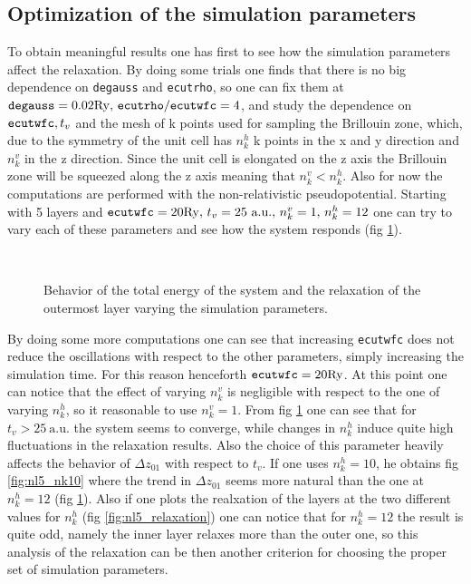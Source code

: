\documentclass[a4paper, 11pt]{article}
\begin{document}
  \subsection{Optimization of the simulation parameters}
    To obtain meaningful results one has first to see how the simulation parameters affect the relaxation. By doing some trials one finds that there is no big dependence on \verb|degauss| and \verb|ecutrho|, so one can fix them at $\verb|degauss| = 0.02 \si{.Ry},\, \verb|ecutrho|/\verb|ecutwfc| = 4$, and study the dependence on $\verb|ecutwfc|, t_v$ and the mesh of k points used for sampling the Brillouin zone, which, due to the symmetry of the unit cell has $n_k^h$ k points in the x and y direction and $n_k^v$ in the z direction. Since the unit cell is elongated on the z axis the Brillouin zone will be squeezed along the z axis meaning that $n_k^v < n_k^h$. Also for now the computations are performed with the non-relativistic pseudopotential.
    Starting with 5 layers and $\verb|ecutwfc| = 20 \si{.Ry},\, t_v = 25\ \text{a.u.},\, n_k^v = 1,\, n_k^h = 12$ one can try to vary each of these parameters and see how the system responds (fig \ref{fig:nl5_tuning}).

    \begin{figure}[H]
      \centering
       \\
      \caption{Behavior of the total energy of the system and the relaxation of the outermost layer varying the simulation parameters.}
      \label{fig:nl5_tuning}
    \end{figure}

    By doing some more computations one can see that increasing \verb|ecutwfc| does not reduce the oscillations with respect to the other parameters, simply increasing the simulation time. For this reason henceforth $\verb|ecutwfc| = 20 \si{.Ry}$. At this point one can notice that the effect of varying $n_k^v$ is negligible with respect to the one of varying $n_k^h$, so it reasonable to use $n_k^v = 1$.
    From fig \ref{fig:nl5_tuning} one can see that for $t_v > 25\ \text{a.u.}$ the system seems to converge, while changes in $n_k^h$ induce quite high fluctuations in the relaxation results. Also the choice of this parameter heavily affects the behavior of $\Delta z_{01}$ with respect to $t_v$.
    If one uses $n_k^h = 10$, he obtains fig \ref{fig:nl5_nk10} where the trend in $\Delta z_{01}$ seems more natural than the one at $n_k^h = 12$ (fig \ref{fig:nl5_tuning}).
    Also if one plots the realxation of the layers at the two different values for $n_k^h$ (fig \ref{fig:nl5_relaxation}) one can notice that for $n_k^h = 12$ the result is quite odd, namely the inner layer relaxes more than the outer one, so this analysis of the relaxation can be then another criterion for choosing the proper set of simulation parameters.
\end{document}
